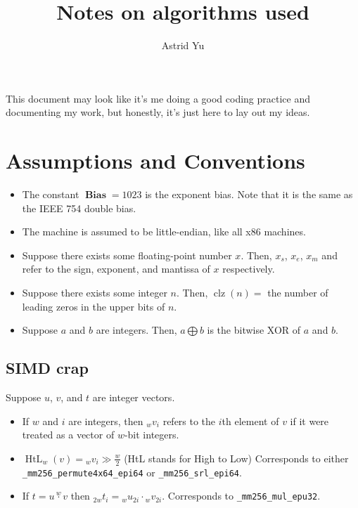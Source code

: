 \documentclass[12pt]{article}
\title{Notes on algorithms used}
\author{Astrid Yu}
\DeclareMathOperator{\bias}{\textbf{Bias}}
\DeclareMathOperator{\htl}{HtL}
\DeclareMathOperator{\clz}{clz}
\begin{document}
    \maketitle
    \tableofcontents

    This document may look like it's me doing a good coding practice and documenting my work, but honestly, it's just here to lay out my ideas.

    \section{Assumptions and Conventions}\label{sec:assumptions}

    \begin{itemize}
        \item The constant $\bias = 1023$ is the exponent bias.
        Note that it is the same as the IEEE 754 double bias.
        \item The machine is assumed to be little-endian, like all x86 machines.
        \item Suppose there exists some floating-point number $x$.
        Then, $x_s$, $x_e$, $x_m$ and refer to the sign, exponent, and mantissa of $x$ respectively.
        \item Suppose there exists some integer $n$.
        Then, $\clz(n) =$ the number of leading zeros in the upper bits of $n$.
        \item Suppose $a$ and $b$ are integers.
        Then, $a \bigoplus b$ is the bitwise XOR of $a$ and $b$.
    \end{itemize}

    \subsection{SIMD crap}\label{subsec:simd-assumptions}
    Suppose $u$, $v$, and $t$ are integer vectors.

    \begin{itemize}
        \item If $w$ and $i$ are integers, then ${}_w v_i$ refers to the $i$th element of $v$ if it were treated as a vector of $w$-bit integers.
        \item $\htl_w(v) = {}_w v_i \gg \frac{w}{2}$ (HtL stands for High to Low)
        Corresponds to either \texttt{\_mm256\_permute4x64\_epi64} or \texttt{\_mm256\_srl\_epi64}.
        \item If $t = u \stackrel{w}{\cdot} v$ then ${}_{2w} t_{i} = {}_w u_{2i} \cdot {}_w v_{2i}$.
        Corresponds to \texttt{\_mm256\_mul\_epu32}.
    \end{itemize}
\end{document}
